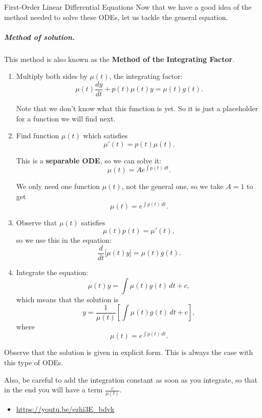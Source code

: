 \begin{submodule}{First-Order Linear Differential Equations}
Now that we have a good idea of the method needed to solve these ODEs, let us tackle the general equation.


\subparagraph{\color{cyan}Method of solution. } This method is also known as the \textbf{\color{cyan}Method of the Integrating Factor}. 
\begin{enumerate}[label={\bf \arabic*. } ]
\item Multiply both sides by $\mu(t)$, the integrating factor:
$$
\mu(t) \frac{dy}{dt} + p(t)\mu(t) y = \mu(t) g(t).
$$

Note that we don't know what this function is yet. So it is just a placeholder for a function we will find next.

\item Find function $\mu(t)$ which satisfies
$$
\mu'(t) = p(t) \mu(t).
$$

This is a \textbf{\color{cyan}separable ODE}, so we can solve it:
$$
\mu(t) = A e^{\int p(t) \, dt}.
$$

We only need one function $\mu(t)$, not the general one, so we take $A=1$ to get
$$
\mu(t) = e^{\int p(t) \, dt}.
$$

\item Observe that $\mu(t)$ satisfies
$$
\mu(t) p(t) = \mu'(t),
$$
so we use this in the equation:
$$
\frac{d}{dt} \big[ \mu(t) y \big] = \mu(t) g(t).
$$

\item Integrate the equation:
$$
\mu(t) y = \int \mu(t) g(t) \, dt + c,
$$
which means that the solution is
$$
y = \frac{1}{\mu(t)} \left[ \int \mu(t) g(t) \, dt + c \right],
$$
where 
$$
\mu(t) = e^{\int p(t) \, dt}.
$$

\end{enumerate}

\begin{important}
	Observe that the solution is given in explicit form. This is always the case with this type of ODEs.
	
	Also, be careful to add the integration constant as soon as you integrate, so that in the end you will have a term $\frac{c}{\mu(t)}$.
\end{important}


\begin{video}
\begin{itemize}
	\item \href{https://youtu.be/ezhi3E_bdvk}{https://youtu.be/ezhi3E\_bdvk} \hfill {}
\end{itemize}	
\end{video}

\end{submodule}


